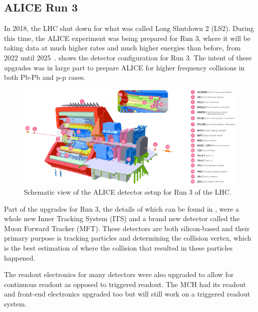 \documentclass[11pt]{article}
\numberwithin{equation}{section}
\numberwithin{figure}{section}
\numberwithin{table}{section}
\begin{document}
\subsection{ALICE Run 3}
In 2018, the LHC shut down for what was called Long Shutdown 2 (LS2). During this time, the ALICE experiment was being prepared for Run 3, where it will be taking data at much higher rates and much higher energies than before, from 2022 until 2025~\cite{ALICE_Upgrade_LOI}.  shows the detector configuration for Run 3. The intent of these upgrades was in large part to prepare ALICE for higher frequency collisions in both Pb-Pb and p-p cases. 

\begin{figure}[h]
    \begin{center}
        \includegraphics[width=.8\textwidth]{Figs/ALICE_RUN3_schematic.png}
        \caption{Schematic view of the ALICE detector setup for Run 3 of the LHC. }
        \label{fig:ALICE_Schematic}
    \end{center}
\end{figure}

Part of the upgrades for Run 3, the details of which can be found in \citeauthor{ALICE_Upgrade_LOI}, were a whole new Inner Tracking System (ITS) and a brand new detector called the Muon Forward Tracker (MFT). These detectors are both silicon-based and their primary purpose is tracking particles and determining the collision vertex, which is the best estimation of where the collision that resulted in these particles happened. 

The readout electronics for many detectors were also upgraded to allow for continuous readout as opposed to triggered readout. The MCH had its readout and front-end electronics upgraded too but will still work on a triggered readout system.
\end{document}

